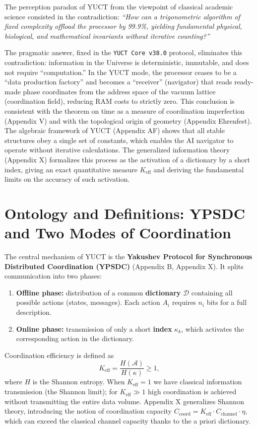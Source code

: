 \documentclass[12pt,a4paper]{article}
\begin{document}
	The perception paradox of YUCT from the viewpoint of classical academic science consisted in the contradiction: \textit{“How can a trigonometric algorithm of fixed complexity offload the processor by 99.9\%, yielding fundamental physical, biological, and mathematical invariants without iterative counting?”}
	
	The pragmatic answer, fixed in the \texttt{YUCT Core v38.0} protocol, eliminates this contradiction: information in the Universe is deterministic, immutable, and does not require “computation.” In the YUCT mode, the processor ceases to be a “data production factory” and becomes a “receiver” (navigator) that reads ready-made phase coordinates from the address space of the vacuum lattice (coordination field), reducing RAM costs to strictly zero. This conclusion is consistent with the theorem on time as a measure of coordination imperfection (Appendix V) and with the topological origin of geometry (Appendix Ehrenfest). The algebraic framework of YUCT (Appendix AF) shows that all stable structures obey a single set of constants, which enables the AI navigator to operate without iterative calculations. The generalized information theory (Appendix X) formalizes this process as the activation of a dictionary by a short index, giving an exact quantitative measure \(K_{\mathrm{eff}}\) and deriving the fundamental limits on the accuracy of such activation.
	
	\section{Ontology and Definitions: YPSDC and Two Modes of Coordination}
	\label{sec:ontology}
	
	The central mechanism of YUCT is the \textbf{Yakushev Protocol for Synchronous Distributed Coordination (YPSDC)} (Appendix B, Appendix X). It splits communication into two phases:
	
	\begin{enumerate}
		\item \textbf{Offline phase:} distribution of a common \textbf{dictionary} \(\mathcal{D}\) containing all possible actions (states, messages). Each action \(A_i\) requires \(n_i\) bits for a full description.
		\item \textbf{Online phase:} transmission of only a short \textbf{index} \(\kappa_k\), which activates the corresponding action in the dictionary.
	\end{enumerate}
	
	Coordination efficiency is defined as
	\[
	K_{\mathrm{eff}} = \frac{H(\mathcal{A})}{H(\kappa)} \ge 1,
	\]
	where \(H\) is the Shannon entropy. When \(K_{\mathrm{eff}} = 1\) we have classical information transmission (the Shannon limit); for \(K_{\mathrm{eff}} \gg 1\) high coordination is achieved without transmitting the entire data volume. Appendix X generalizes Shannon theory, introducing the notion of coordination capacity \(C_{\text{coord}} = K_{\mathrm{eff}} \cdot C_{\text{channel}} \cdot \eta\), which can exceed the classical channel capacity thanks to the a priori dictionary.
	
\end{document}
